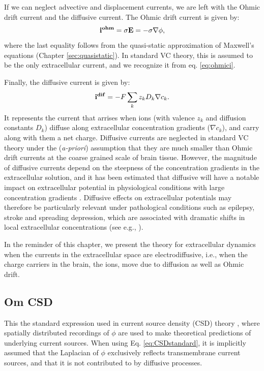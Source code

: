 If we can neglect advective and displacement currents, we are left with the Ohmic drift current and the diffusive current. The Ohmic drift current is given by:
\begin{equation}
{\bf i^{ohm}} = \sigma {\bf E} = - \sigma \nabla \phi,
\label{eq:ohmiciagain}
\end{equation}
where the last equality follows from the quasi-static approximation of Maxwell's equations (Chapter \ref{sec:quasistatic}). In standard VC theory, this is assumed to be the only extracellular current, and we recognize it from eq. \ref{eq:ohmici}. 

Finally, the diffusive current is given by: 
\begin{equation}
{\bf i^{dif}} = -F \sum_k z_k D_k \nabla c_k.
\label{eq:idif}
\end{equation}
It represents the current that arrises when ions (with valence $z_k$ and diffusion constants $D_k$) diffuse along extracellular concentration gradients ($\nabla c_k$), and carry along with them a net charge. Diffusive currents are neglected in standard VC theory under the (\textit{a-priori}) assumption that they are much smaller than Ohmic drift currents at the coarse grained scale of brain tissue. However, the magnitude of diffusive currents depend on the steepness of the concentration gradients in the extracellular solution, and it has been estimated that diffusive will have a notable impact on extracellular potential in physiological conditions with large concentration gradients  \cite{Halnes2016, Gratiy2017}. Diffusive effects on extracellular potentials may therefore be particularly relevant under pathological conditions such as epilepsy, stroke and spreading depression, which are associated with dramatic shifts in local extracellular concentrations (see e.g.,  \cite{Somjen2001, Frohlich2008, Wei2014, Ayata2015}). 

In the reminder of this chapter, we present the theory for extracellular dynamics when the currents in the extracellular space are electrodiffusive, i.e., when the charge carriers in the brain, the ions, move due to diffusion as well as Ohmic drift. 



\subsection{Om CSD}
This the standard expression used in current source density (CSD) theory \citep{Mitzdorf1985, Nicholson1975, Pettersen2006}, where spatially distributed recordings of $\phi$ are used to make theoretical predictions of underlying current sources. When using Eq. \ref{eq:CSDstandard}, it is implicitly assumed that the Laplacian of $\phi$ exclusively reflects transmembrane current sources, and that it is not contributed to by diffusive processes. 



